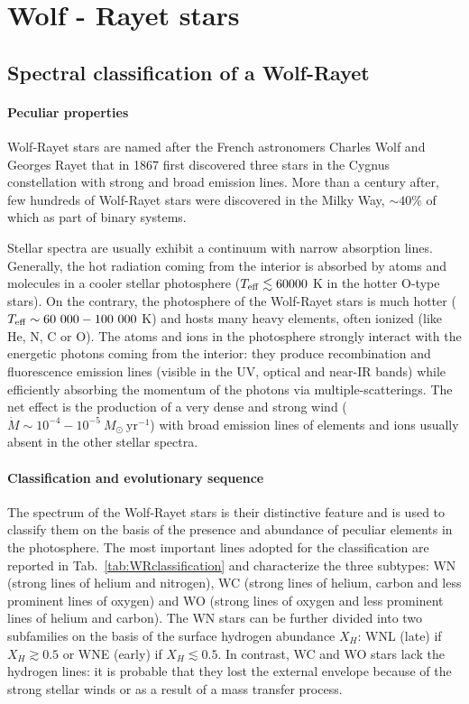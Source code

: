 \documentclass[a4paper,titlepage]{book}     	%
\newcommand{\sun}{\ensuremath{_\odot}}
\newcommand{\mdot}{\ensuremath{\dot{M}}}
\newcommand{\msun}{\ensuremath{M\sun}}
\newcommand{\yr}{\text{yr}}
\begin{document}
\section{Wolf - Rayet stars}
\subsection{Spectral classification of a Wolf-Rayet}\label{subsec:WRclassification}
\paragraph{Peculiar properties} Wolf-Rayet stars are named after the French astronomers Charles Wolf and Georges Rayet that in 1867 first discovered three stars in the Cygnus constellation with strong and broad emission lines. More than a century after, few hundreds of Wolf-Rayet stars were discovered in the Milky Way, $\sim 40 \%$ of which as part of binary systems.

Stellar spectra are usually exhibit a continuum with narrow absorption lines. Generally, the hot radiation coming from the interior is absorbed by atoms and molecules in a cooler stellar photosphere ($T_{\rm eff} \lesssim 60 000$ K in the hotter O-type stars). On the contrary, the photosphere of the Wolf-Rayet stars is much hotter ($T_{\rm eff} \sim 60~000 - 100~000$ K) and hosts many heavy elements, often ionized (like He, N, C or O). The atoms and ions in the photosphere strongly interact with the energetic photons coming from the interior: they produce recombination and fluorescence emission lines (visible in the UV, optical and near-IR bands) while efficiently absorbing the momentum of the photons via multiple-scatterings. The net effect is the production of a very dense and strong wind ($\mdot \sim 10^{-4}-10^{-5}~\msun~\yr^{-1}$) with broad emission lines of elements and ions usually absent in the other stellar spectra.

\paragraph{Classification and evolutionary sequence}The spectrum of the Wolf-Rayet stars is their distinctive feature and is used to classify them on the basis of the presence and abundance of peculiar elements in the photosphere. The most important lines adopted for the classification are reported in Tab.\ \ref{tab:WRclassification} and characterize the three subtypes: WN (strong lines of helium and nitrogen), WC (strong lines of helium, carbon and less prominent lines of oxygen) and WO (strong lines of oxygen and less prominent lines of helium and carbon). The WN stars can be further divided into two subfamilies on the basis of the surface hydrogen abundance $X_H$: WNL (late) if $X_H \gtrsim 0.5$ or WNE (early) if $X_H \lesssim 0.5$. In contrast, WC and WO stars lack the hydrogen lines: it is probable that they lost the external envelope because of the strong stellar winds or as a result of a mass transfer process.  
\end{document}
